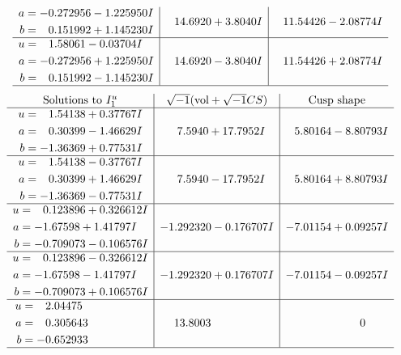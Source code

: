 \documentclass[1p]{elsarticle_modified}
\theoremstyle{definition}
\newcommand{\I}{\sqrt{-1}}
\begin{document}
$$\begin{array}{c|c|c}
\begin{aligned}
a &= -0.272956 - 1.225950 I \\
b &= \phantom{-}0.151992 + 1.145230 I\end{aligned}
 & \phantom{-}14.6920 + 3.8040 I & \phantom{-}11.54426 - 2.08774 I \\ \hline\begin{aligned}
u &= \phantom{-}1.58061 - 0.03704 I \\
a &= -0.272956 + 1.225950 I \\
b &= \phantom{-}0.151992 - 1.145230 I\end{aligned}
 & \phantom{-}14.6920 - 3.8040 I & \phantom{-}11.54426 + 2.08774 I\\
 \hline 
 \end{array}$$\newpage$$\begin{array}{c|c|c}  
\text{Solutions to }I^u_{1}& \I (\text{vol} + \sqrt{-1}CS) & \text{Cusp shape}\\
 \hline 
\begin{aligned}
u &= \phantom{-}1.54138 + 0.37767 I \\
a &= \phantom{-}0.30399 - 1.46629 I \\
b &= -1.36369 + 0.77531 I\end{aligned}
 & \phantom{-}7.5940 + 17.7952 I & \phantom{-}5.80164 - 8.80793 I \\ \hline\begin{aligned}
u &= \phantom{-}1.54138 - 0.37767 I \\
a &= \phantom{-}0.30399 + 1.46629 I \\
b &= -1.36369 - 0.77531 I\end{aligned}
 & \phantom{-}7.5940 - 17.7952 I & \phantom{-}5.80164 + 8.80793 I \\ \hline\begin{aligned}
u &= \phantom{-}0.123896 + 0.326612 I \\
a &= -1.67598 + 1.41797 I \\
b &= -0.709073 - 0.106576 I\end{aligned}
 & -1.292320 - 0.176707 I & -7.01154 + 0.09257 I \\ \hline\begin{aligned}
u &= \phantom{-}0.123896 - 0.326612 I \\
a &= -1.67598 - 1.41797 I \\
b &= -0.709073 + 0.106576 I\end{aligned}
 & -1.292320 + 0.176707 I & -7.01154 - 0.09257 I \\ \hline\begin{aligned}
u &= \phantom{-}2.04475\phantom{ +0.000000I} \\
a &= \phantom{-}0.305643\phantom{ +0.000000I} \\
b &= -0.652933\phantom{ +0.000000I}\end{aligned}
 & \phantom{-}13.8003\phantom{ +0.000000I} & \phantom{-0.000000 } 0\\
 \hline 
 \end{array}$$\newpage\newpage\renewcommand{\arraystretch}{1}
\end{document}
